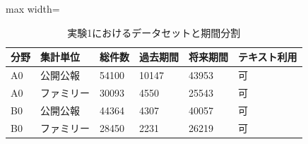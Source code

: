 \begin{table}[tbp]
\centering
\small
\caption{実験1におけるデータセットと期間分割}
\label{tab:experiment1_dataset_table}
\begin{adjustbox}{max width=\textwidth}
\begin{tabular}{llllll}
\toprule
分野 & 集計単位 & 総件数 & 過去期間 & 将来期間 & テキスト利用 \\
\midrule
A0 & 公開公報 & 54100 & 10147 & 43953 & 可 \\
A0 & ファミリー & 30093 & 4550 & 25543 & 可 \\
B0 & 公開公報 & 44364 & 4307 & 40057 & 可 \\
B0 & ファミリー & 28450 & 2231 & 26219 & 可 \\
\bottomrule
\end{tabular}
\end{adjustbox}
\end{table}
